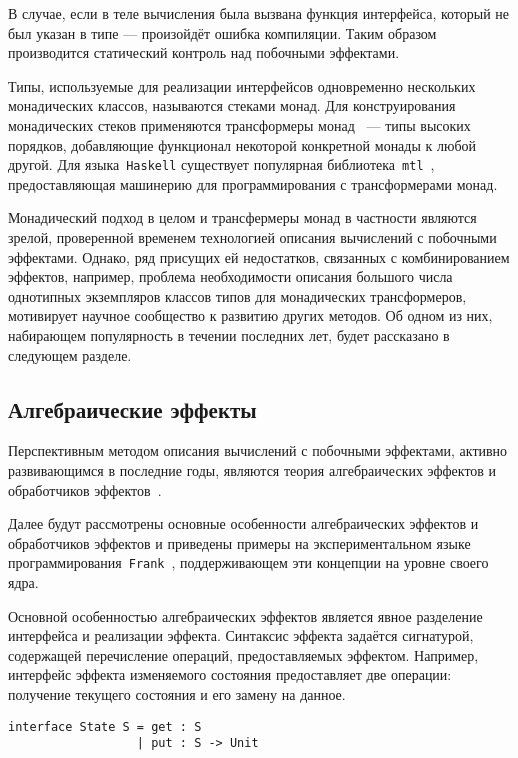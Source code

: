 \documentclass [a4paper] {article}
\begin{document}
В случае, если в теле вычисления была вызвана функция интерфейса,
который не был указан в типе --- произойдёт ошибка компиляции.
Таким образом производится статический контроль над побочными
эффектами.

Типы, используемые для реализации интерфейсов одновременно нескольких
монадических классов, называются стеками монад. Для конструирования
монадических стеков применяются трансформеры монад~\cite{monadTransformers}
--- типы высоких порядков,
добавляющие функционал некоторой конкретной монады к любой другой. Для
языка~\texttt{Haskell} существует популярная библиотека~\texttt{mtl}~\cite{mtlHackage},
предоставляющая машинерию для программирования с трансформерами монад.

Монадический подход в целом и трансфермеры монад в частности являются зрелой,
проверенной временем технологией описания вычислений с побочными эффектами.
Однако, ряд присущих ей недостатков, связанных с комбинированием эффектов,
например, проблема необходимости описания большого числа однотипных
экземпляров классов типов для монадических трансформеров, мотивирует научное
сообщество к развитию других методов. Об одном из них, набирающем популярность
в течении последних лет, будет рассказано в следующем разделе.

\subsection{Алгебраические эффекты}

Перспективным методом описания вычислений с побочными эффектами, активно
развивающимся в последние годы, являются теория алгебраических
эффектов и обработчиков эффектов~\cite{AlgEffects}.

Далее будут рассмотрены основные особенности алгебраических эффектов и
обработчиков эффектов и приведены примеры на экспериментальном языке
программирования~\texttt{Frank}~\cite{Frank}, поддерживающем эти концепции на уровне своего ядра.

Основной особенностью алгебраических эффектов является явное разделение
интерфейса и реализации эффекта. Синтаксис эффекта задаётся сигнатурой,
содержащей перечисление операций, предоставляемых эффектом. Например, интерфейс
эффекта изменяемого состояния предоставляет две операции: получение текущего
состояния и его замену на данное.

\begin{verbatim}
interface State S = get : S
                  | put : S -> Unit
\end{verbatim}
\end{document}
